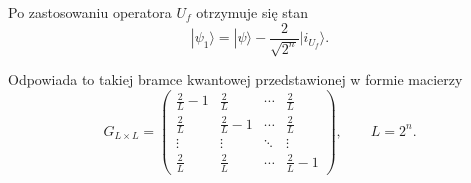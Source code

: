 \newpage
\noindent
Po zastosowaniu operatora $U_f$ otrzymuje się stan \cite[s.~163, wz.~(4.72)]{inf_kwant}   
\begin{equation}
\label{eq:diffusion_operator1}
|\psi_1\rangle=|\psi\rangle-\frac{2}{\sqrt{2^n}}|i_{U_f}\rangle.
\end{equation}

\noindent
Odpowiada to takiej bramce kwantowej przedstawionej w formie macierzy \cite[s.~277, wz.~(5.364)]{inf_kwant}
\begin{equation}
\label{eq:diffusion_matrix} 
G_{L\times L}=
\begin{pmatrix}
\frac2L-1 & \frac2L & \cdots & \frac2L\\
\frac2L & \frac2L-1 & \cdots & \frac2L\\
\vdots & \vdots & \ddots & \vdots\\
\frac2L & \frac2L & \cdots & \frac2L-1
\end{pmatrix},
\qquad
L=2^n.
\end{equation}


